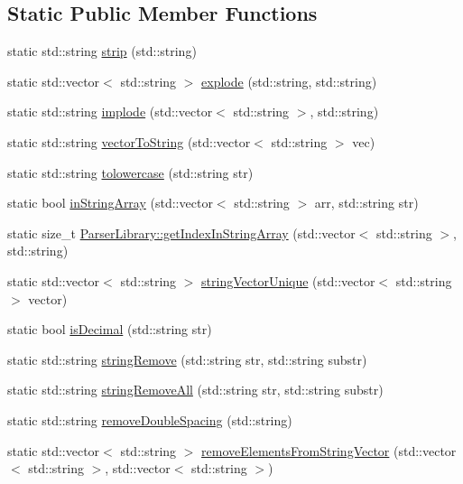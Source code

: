 \subsection*{Static Public Member Functions}
\begin{DoxyCompactItemize}
\item 
static std\+::string \hyperlink{class_do_lah_1_1_parser_library_a62e88d1b555c10907f6b9dd0151cedf5}{strip} (std\+::string)
\item 
static std\+::vector$<$ std\+::string $>$ \hyperlink{class_do_lah_1_1_parser_library_ae3403a5405c6d01ae359993993ddc0df}{explode} (std\+::string, std\+::string)
\item 
static std\+::string \hyperlink{class_do_lah_1_1_parser_library_a039b701d33e69b5267539124fc09af7f}{implode} (std\+::vector$<$ std\+::string $>$, std\+::string)
\item 
static std\+::string \hyperlink{class_do_lah_1_1_parser_library_a3001326a193fdce02c956405cb07a4c5}{vector\+To\+String} (std\+::vector$<$ std\+::string $>$ vec)
\item 
static std\+::string \hyperlink{class_do_lah_1_1_parser_library_a671287b3b750e9467aa46335ccceb745}{tolowercase} (std\+::string str)
\item 
static bool \hyperlink{class_do_lah_1_1_parser_library_a5466cb23270e52817d9f653fe23c6b21}{in\+String\+Array} (std\+::vector$<$ std\+::string $>$ arr, std\+::string str)
\item 
static size\+\_\+t \hyperlink{class_do_lah_1_1_parser_library_ad0af2ae74e0b39013ea431c20bda28d8}{Parser\+Library\+::get\+Index\+In\+String\+Array} (std\+::vector$<$ std\+::string $>$, std\+::string)
\item 
static std\+::vector$<$ std\+::string $>$ \hyperlink{class_do_lah_1_1_parser_library_a29ac4f198660788072f8124119ef1c5a}{string\+Vector\+Unique} (std\+::vector$<$ std\+::string $>$ vector)
\item 
static bool \hyperlink{class_do_lah_1_1_parser_library_a800e349eeb2fd551f4f2140a4a52ca2e}{is\+Decimal} (std\+::string str)
\item 
static std\+::string \hyperlink{class_do_lah_1_1_parser_library_ac8ed43ef1073237383b4ace84fec3e31}{string\+Remove} (std\+::string str, std\+::string substr)
\item 
static std\+::string \hyperlink{class_do_lah_1_1_parser_library_abdb93eae4458611b13ebd84c2cb5112b}{string\+Remove\+All} (std\+::string str, std\+::string substr)
\item 
static std\+::string \hyperlink{class_do_lah_1_1_parser_library_a22c163588b20e58a034345e09c909dd6}{remove\+Double\+Spacing} (std\+::string)
\item 
static std\+::vector$<$ std\+::string $>$ \hyperlink{class_do_lah_1_1_parser_library_af66ce345a48f0b04356487efc700e65a}{remove\+Elements\+From\+String\+Vector} (std\+::vector$<$ std\+::string $>$, std\+::vector$<$ std\+::string $>$)
\end{DoxyCompactItemize}


